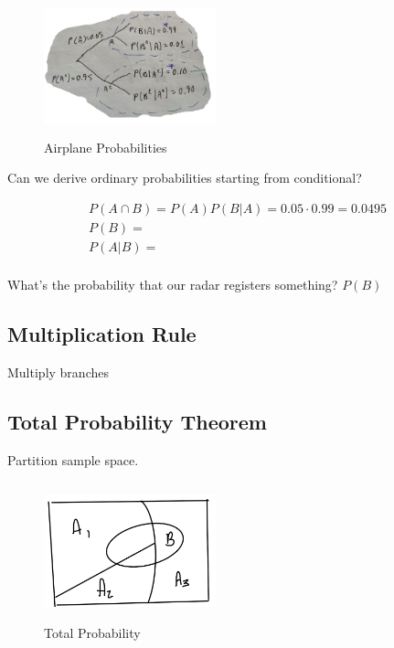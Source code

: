 \begin{figure}[ht]
\centering
\includegraphics[width=5cm, height=4cm]{images/L02/airplane_radar.jpeg}
\caption{Airplane Probabilities}
\end{figure}

Can we derive ordinary probabilities starting from conditional?

\begin{align*}
P(A \cap B) = P(A)P(B|A) = 0.05\cdot 0.99 = 0.0495\\
P(B) =\\
P(A|B) =\\
\end{align*}


What's the probability that our radar registers something? $P(B)$

\subsection{Multiplication Rule}


Multiply branches


\subsection{Total Probability Theorem}

Partition sample space.

\begin{figure}[ht]
\centering
\includegraphics[width=5cm, height=4cm]{images/L02/total_prob.jpeg}
\caption{Total Probability}
\end{figure}

